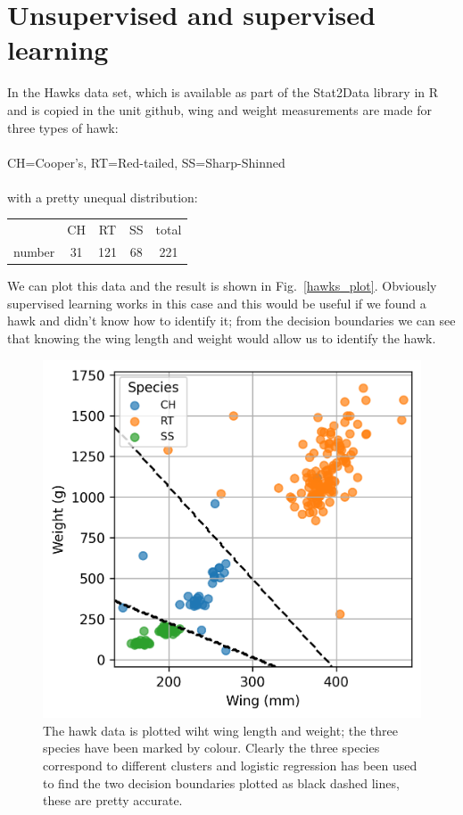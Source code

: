 \documentclass[12pt]{article}
\begin{document}
\section*{Unsupervised and supervised learning}

In the Hawks data set, which is available as part of the Stat2Data
library in R and is copied in the unit github, wing and weight measurements are made for three types of hawk:\\
\\
CH=Cooper's, RT=Red-tailed, SS=Sharp-Shinned\\
\\
with a pretty unequal distribution:
\begin{center}
  
\begin{tabular}{lcccc}
  &CH&RT&SS&total\\
  number&31&121&68&221
  \end{tabular}
\end{center}
We can plot this data and the result is shown in Fig.~\ref{hawks_plot}. Obviously supervised learning works in this case and this would be useful if we found a hawk and didn't know how to identify it; from the decision boundaries we can see that knowing the wing length and weight would allow us to identify the hawk.

\begin{figure}[htb]
\begin{center}  
  \includegraphics{hawks_plot.png}
\end{center}
\caption{The hawk data is plotted wiht wing length and weight; the three species have been marked by colour. Clearly the three species correspond to different clusters and logistic regression has been used to find the two decision boundaries plotted as black dashed lines, these are pretty accurate.\label{fig:hawks_plot}}
\end{figure}
\end{document}
